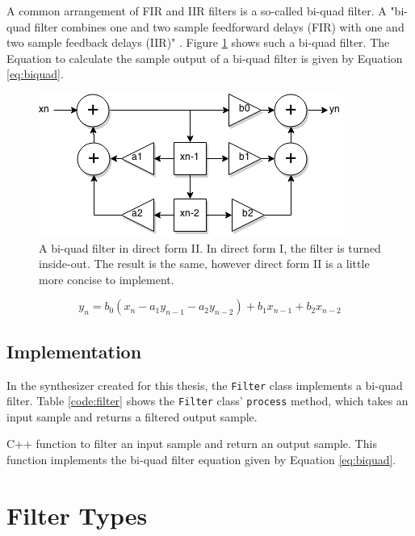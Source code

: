 \documentclass[12pt,twoside]{report}
\begin{document}
A common arrangement of FIR and IIR filters is a so-called bi-quad filter. A "bi-quad filter combines one and two sample feedforward delays (FIR) with one and two sample feedback delays (IIR)" . Figure \ref{fig:biquad} shows such a bi-quad filter. The Equation to calculate the sample output of a bi-quad filter is given by Equation \ref{eq:biquad}.

\begin{figure}[h!]
  \includegraphics[scale=0.7]{img/biquad}
  \caption{A bi-quad filter in direct form II. In direct form I, the filter is turned inside-out. The result is the same, however direct form II is a little more concise to implement. }
  \label{fig:biquad}
\end{figure}

\begin{equation}
  y_{n} = b_{0}(x_{n} - a_{1}y_{n-1} - a_{2}y_{n-2}) + b_{1}x_{n-1} + b_{2}x_{n-2}
  \label{eq:biquad}
\end{equation}

\subsection{Implementation}

In the synthesizer created for this thesis, the \texttt{Filter} class implements a bi-quad filter. Table \ref{code:filter} shows the \texttt{Filter} class' \texttt{process} method, which takes an input sample and returns a filtered output sample.

\begin{table}[h!]
  \caption{C++ function to filter an input sample and return an output sample. This function implements the bi-quad filter equation given by Equation \ref{eq:biquad}.}
  \label{code:filter}
\end{table}

\pagebreak

\section{Filter Types}
\end{document}
